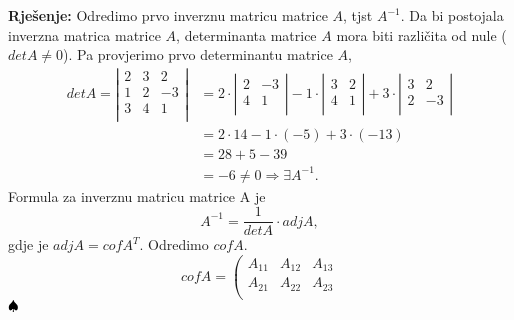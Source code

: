 \documentclass{article}
\newenvironment{solution}{\noindent\textbf{Rje\v senje:\newline}}{$\hfill\spadesuit$}
\begin{document}
\begin{solution}
    Odredimo prvo inverznu matricu matrice $A$, tjst $A^{-1}$.
    Da bi postojala inverzna matrica matrice $A$, determinanta matrice $A$ mora biti razli\v cita od nule ($detA\neq 0$).
    Pa provjerimo prvo determinantu matrice $A$,
    \newline
    \begin{equation*}
        \begin{aligned}
            detA=\left|
            \begin{array}{ccc}
                2 & 3 & 2 \\
                1 & 2 & -3 \\
                3 & 4 & 1 \\
            \end{array}
            \right|
            &=2\cdot \left|
            \begin{array}{cc}
                2 & -3 \\
                4 & 1 \\
            \end{array}
            \right| -
            1\cdot \left|
            \begin{array}{cc}
                3 & 2 \\
                4 & 1 \\
            \end{array}
            \right| +
            3\cdot \left|
            \begin{array}{cc}
                3 & 2 \\
                2 & -3 \\
            \end{array}
            \right|\\
            &=2\cdot 14 -1\cdot (-5)+3\cdot (-13)\\
            &=28+5-39\\
            &=-6\neq 0\Rightarrow\exists A^{-1}.
        \end{aligned}
    \end{equation*}
    Formula za inverznu matricu matrice A je
    $$A^{-1}=\frac{1}{detA}\cdot adjA,$$
    gdje je $adjA=cofA^T$. Odredimo $cofA$.
    \begin{equation*}
        cofA=\left(
        \begin{array}{ccc}
            A_{11} & A_{12} & A_{13} \\
            A_{21} & A_{22} & A_{23} \\

\end{array}
\end{equation*}
\end{solution}
\end{document}
